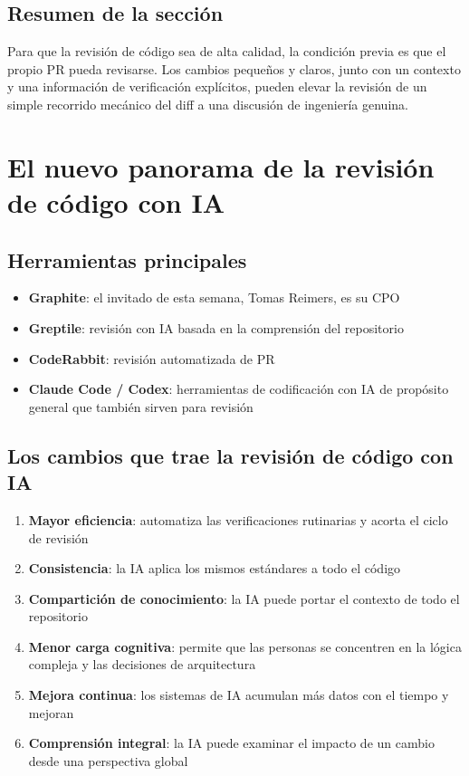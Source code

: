 \documentclass[a4paper]{article}
\begin{document}
\subsection{Resumen de la sección}

Para que la revisión de código sea de alta calidad, la condición previa es que el propio PR pueda revisarse. Los cambios pequeños y claros, junto con un contexto y una información de verificación explícitos, pueden elevar la revisión de un simple recorrido mecánico del diff a una discusión de ingeniería genuina.
\section{El nuevo panorama de la revisión de código con IA}

\subsection{Herramientas principales}

\begin{itemize}
    \item \textbf{Graphite}: el invitado de esta semana, Tomas Reimers, es su CPO
    \item \textbf{Greptile}: revisión con IA basada en la comprensión del repositorio
    \item \textbf{CodeRabbit}: revisión automatizada de PR
    \item \textbf{Claude Code / Codex}: herramientas de codificación con IA de propósito general que también sirven para revisión
\end{itemize}

\subsection{Los cambios que trae la revisión de código con IA}

\begin{enumerate}
    \item \textbf{Mayor eficiencia}: automatiza las verificaciones rutinarias y acorta el ciclo de revisión
    \item \textbf{Consistencia}: la IA aplica los mismos estándares a todo el código
    \item \textbf{Compartición de conocimiento}: la IA puede portar el contexto de todo el repositorio
    \item \textbf{Menor carga cognitiva}: permite que las personas se concentren en la lógica compleja y las decisiones de arquitectura
    \item \textbf{Mejora continua}: los sistemas de IA acumulan más datos con el tiempo y mejoran
    \item \textbf{Comprensión integral}: la IA puede examinar el impacto de un cambio desde una perspectiva global
\end{enumerate}
\end{document}

